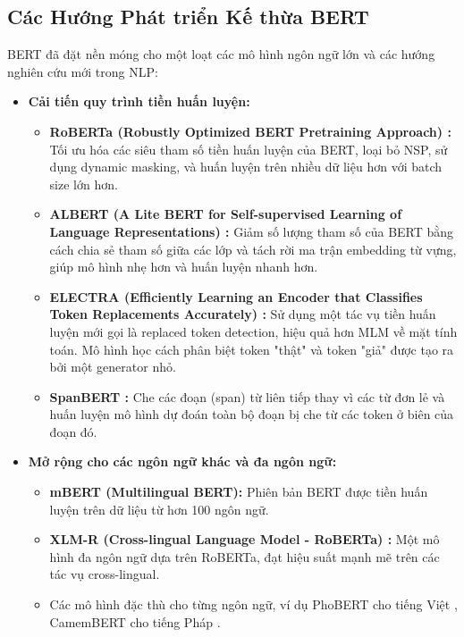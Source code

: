 \subsection{Các Hướng Phát triển Kế thừa BERT}
\label{ssec:huong_phat_trien_ke_thua}
BERT đã đặt nền móng cho một loạt các mô hình ngôn ngữ lớn và các hướng nghiên cứu mới trong NLP:
\begin{itemize}
    \item \textbf{Cải tiến quy trình tiền huấn luyện:}
        \begin{itemize}
            \item \textbf{RoBERTa (Robustly Optimized BERT Pretraining Approach) \cite{liu2019roberta}:} Tối ưu hóa các siêu tham số tiền huấn luyện của BERT, loại bỏ NSP, sử dụng dynamic masking, và huấn luyện trên nhiều dữ liệu hơn với batch size lớn hơn.
            \item \textbf{ALBERT (A Lite BERT for Self-supervised Learning of Language Representations) \cite{lan2019albert}:} Giảm số lượng tham số của BERT bằng cách chia sẻ tham số giữa các lớp và tách rời ma trận embedding từ vựng, giúp mô hình nhẹ hơn và huấn luyện nhanh hơn.
            \item \textbf{ELECTRA (Efficiently Learning an Encoder that Classifies Token Replacements Accurately) \cite{clark2020electra}:} Sử dụng một tác vụ tiền huấn luyện mới gọi là replaced token detection, hiệu quả hơn MLM về mặt tính toán. Mô hình học cách phân biệt token "thật" và token "giả" được tạo ra bởi một generator nhỏ.
            \item \textbf{SpanBERT \cite{joshi2020spanbert}:} Che các đoạn (span) từ liên tiếp thay vì các từ đơn lẻ và huấn luyện mô hình dự đoán toàn bộ đoạn bị che từ các token ở biên của đoạn đó.
        \end{itemize}
    \item \textbf{Mở rộng cho các ngôn ngữ khác và đa ngôn ngữ:}
        \begin{itemize}
            \item \textbf{mBERT (Multilingual BERT):} Phiên bản BERT được tiền huấn luyện trên dữ liệu từ hơn 100 ngôn ngữ.
            \item \textbf{XLM-R (Cross-lingual Language Model - RoBERTa) \cite{conneau2019unsupervised}:} Một mô hình đa ngôn ngữ dựa trên RoBERTa, đạt hiệu suất mạnh mẽ trên các tác vụ cross-lingual.
            \item Các mô hình đặc thù cho từng ngôn ngữ, ví dụ PhoBERT cho tiếng Việt \cite{nguyen2020phobert}, CamemBERT cho tiếng Pháp \cite{martin2019camembert}.

\end{itemize}
\end{itemize}
